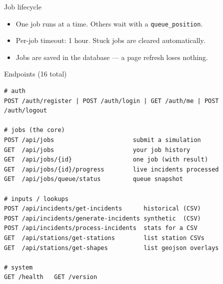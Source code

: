 \documentclass[aspectratio=169,11pt]{beamer}
\begin{document}
\begin{frame}{Job lifecycle}
\vspace{4pt}
\centering
{}

\vspace{12pt}
\begin{itemize}\setlength\itemsep{4pt}
  \item One job runs at a time. Others wait with a \texttt{queue\_position}.
  \item Per-job timeout: 1 hour. Stuck jobs are cleared automatically.
  \item Jobs are saved in the database — a page refresh loses nothing.
\end{itemize}
\end{frame}

\begin{frame}[fragile]{Endpoints (16 total)}
\begin{lstlisting}[language=shell,basicstyle=\ttfamily\scriptsize]
# auth
POST /auth/register | POST /auth/login | GET /auth/me | POST /auth/logout

# jobs (the core)
POST /api/jobs                      submit a simulation
GET  /api/jobs                      your job history
GET  /api/jobs/{id}                 one job (with result)
GET  /api/jobs/{id}/progress        live incidents processed
GET  /api/jobs/queue/status         queue snapshot

# inputs / lookups
POST /api/incidents/get-incidents      historical (CSV)
POST /api/incidents/generate-incidents synthetic  (CSV)
POST /api/incidents/process-incidents  stats for a CSV
GET  /api/stations/get-stations        list station CSVs
GET  /api/stations/get-shapes          list geojson overlays

# system
GET /health   GET /version
\end{lstlisting}
\end{frame}
\end{document}

